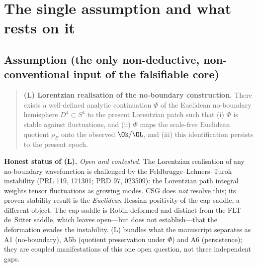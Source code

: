 
\section*{The single assumption and what rests on it}

\subsection*{Assumption (the only non-deductive, non-conventional input of the falsifiable core)}

\begin{quote}
\textbf{(L) Lorentzian realisation of the no-boundary construction.}
There exists a well-defined analytic continuation $\Phi$ of the Euclidean
no-boundary hemisphere $D^4\subset S^4$ to the present Lorentzian patch such
that (i) $\Phi$ is stable against fluctuations, and (ii) $\Phi$ maps the
scale-free Euclidean quotient $\rho_E$ onto the observed
$\Ok/\OL$, and (iii) this identification persists to the present epoch.
\end{quote}

\textbf{Honest status of (L).} \emph{Open and contested.} The Lorentzian
realisation of any no-boundary wavefunction is challenged by the
Feldbrugge--Lehners--Turok instability (PRL 119, 171301; PRD 97, 023509):
the Lorentzian path integral weights tensor fluctuations as growing modes.
CSG does \emph{not} resolve this; its proven stability result is the
\emph{Euclidean} Hessian positivity of the cap saddle, a different object.
The cap saddle is Robin-deformed and distinct from the FLT de~Sitter saddle,
which leaves open---but does not establish---that the deformation evades the
instability. (L) bundles what the manuscript separates as A1 (no-boundary),
A5b (quotient preservation under $\Phi$) and A6 (persistence); they are
coupled manifestations of this one open question, not three independent gaps.

